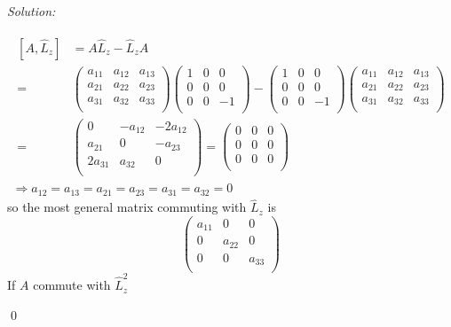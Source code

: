 \documentclass[12pt,a4paper]{article}
\newenvironment{sol}
    {\emph{Solution:}
    }
    {
    \qed
    }
\begin{document}
\begin{sol}
\begin{itemize}
\begin{gather}
\begin{align}
\nonumber[A,\hat{L}_z]&=A\hat{L}_z-\hat{L}_zA\\
\nonumber=&\left(\begin{array}{ccc}
a_{11}&a_{12}&a_{13}\\
a_{21}&a_{22}&a_{23}\\
a_{31}&a_{32}&a_{33}\\
\end{array}\right)\left(\begin{array}{ccc}
1&0&0\\
0&0&0\\
0&0&-1\\
\end{array}\right)-\left(\begin{array}{ccc}
1&0&0\\
0&0&0\\
0&0&-1\\
\end{array}\right)\left(\begin{array}{ccc}
a_{11}&a_{12}&a_{13}\\
a_{21}&a_{22}&a_{23}\\
a_{31}&a_{32}&a_{33}\\
\end{array}\right)\\
=&\left(\begin{array}{ccc}
0&-a_{12}&-2a_{12}\\
a_{21}&0&-a_{23}\\
2a_{31}&a_{32}&0\\
\end{array}\right)=\left(\begin{array}{ccc}
0&0&0\\
0&0&0\\
0&0&0\\
\end{array}\right)
\end{align}\\
\Longrightarrow a_{12}=a_{13}=a_{21}=a_{23}=a_{31}=a_{32}=0
\end{gather}
so the most general matrix commuting with $\hat{L}_z$ is
\begin{equation}
\left(\begin{array}{ccc}
a_{11}&0&0\\
0&a_{22}&0\\
0&0&a_{33}\\
\end{array}\right)
\end{equation}
If $A$ commute with $\hat{L}_z^2$

\end{itemize}
\end{sol}
\end{document}
